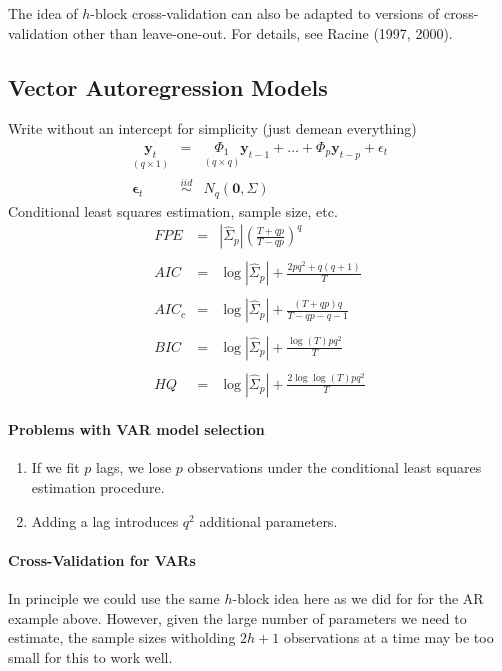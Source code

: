 \documentclass[12pt]{article}
\theoremstyle{definition}
\begin{document}
The idea of $h$-block cross-validation can also be adapted to versions of cross-validation other than leave-one-out. For details, see Racine (1997, 2000).



\subsection{Vector Autoregression Models}
Write without an intercept for simplicity (just demean everything)
	\begin{eqnarray*}
		\underset{(q\times 1)}{\textbf{y}_t} &=& \underset{(q\times q)}{\Phi_1} \textbf{y}_{t-1} + \hdots + \Phi_{p}\textbf{y}_{t-p} + \epsilon_t\\
		\boldsymbol{\epsilon}_t &\overset{iid}{\sim}& N_q(\mathbf{0}, \Sigma)
	\end{eqnarray*}
Conditional least squares estimation, sample size, etc.	
\begin{eqnarray*}
	FPE &=& \left| \widehat{\Sigma}_p \right| \left( \frac{T + qp}{T - qp}\right)^q\\ \\
	AIC &=& \log \left| \widehat{\Sigma}_p\right| + \frac{2pq^2 + q(q+1)}{T}\\ \\ 
	AIC_c &=& \log \left| \widehat{\Sigma}_p\right|  + \frac{(T + qp)q}{T - qp - q -1}\\ \\
	BIC &=& \log \left| \widehat{\Sigma}_p\right| +  \frac{\log(T)pq^2}{T}\\ \\ 
	HQ &=& \log \left| \widehat{\Sigma}_p\right| +  \frac{2 \log\log(T)pq^2}{T}
\end{eqnarray*}

\paragraph{Problems with VAR model selection}
	\begin{enumerate}
		\item If we fit $p$ lags, we lose $p$ observations under the conditional least squares estimation procedure.
		\item Adding a lag introduces $q^2$ additional parameters. 
	\end{enumerate}

\paragraph{Cross-Validation for VARs} In principle we could use the same $h$-block idea here as we did for for the AR example above. However, given the large number of parameters we need to estimate, the sample sizes witholding $2h+1$ observations at a time may be too small for this to work well. 
\end{document}
